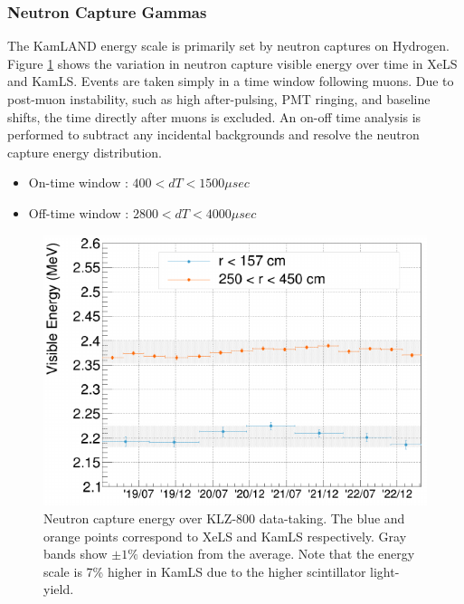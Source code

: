 \subsubsection*{Neutron Capture Gammas}
The KamLAND energy scale is primarily set by neutron captures on Hydrogen. Figure \ref{fig:neutron_capture_energy} shows the variation in neutron capture visible energy over time in XeLS and KamLS. Events are taken simply in a time window following muons. Due to post-muon instability, such as high after-pulsing, PMT ringing, and baseline shifts, the time directly after muons is excluded. An on-off time analysis is performed to subtract any incidental backgrounds and resolve the neutron capture energy distribution.
\begin{itemize}
    \item On-time window : $400<dT<1500 \mu sec$
    \item Off-time window : $2800<dT<4000 \mu sec$
\end{itemize}
\begin{figure}[htb]
	\centering
	\includegraphics[scale=0.65]{neutron_escale.png}
	\caption{Neutron capture energy over KLZ-800 data-taking. The blue and orange points correspond to XeLS and KamLS respectively. Gray bands show $\pm1\%$ deviation from the average. Note that the energy scale is 7\% higher in KamLS due to the higher scintillator light-yield.}
	\label{fig:neutron_capture_energy}
\end{figure}
